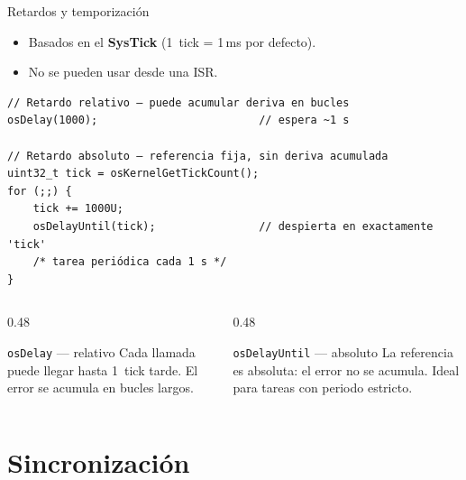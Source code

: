 \begin{frame}[fragile]{Retardos y temporización}
    \begin{itemize}
        \item Basados en el \textbf{SysTick} (1~tick = 1\,ms por defecto).
        \item \alert{No se pueden usar desde una ISR.}
    \end{itemize}
    \begin{verbatim}
// Retardo relativo — puede acumular deriva en bucles
osDelay(1000);                         // espera ~1 s

// Retardo absoluto — referencia fija, sin deriva acumulada
uint32_t tick = osKernelGetTickCount();
for (;;) {
    tick += 1000U;
    osDelayUntil(tick);                // despierta en exactamente 'tick'
    /* tarea periódica cada 1 s */
}
    \end{verbatim}
    \begin{columns}
        \begin{column}{0.48\textwidth}
            \begin{exampleblock}{\texttt{osDelay} — relativo}
                Cada llamada puede llegar hasta
                1~tick tarde. El error se acumula
                en bucles largos.
            \end{exampleblock}
        \end{column}
        \begin{column}{0.48\textwidth}
            \begin{exampleblock}{\texttt{osDelayUntil} — absoluto}
                La referencia es absoluta: el error
                no se acumula. Ideal para tareas
                con periodo estricto.
            \end{exampleblock}
        \end{column}
    \end{columns}
\end{frame}

\section{Sincronización}

